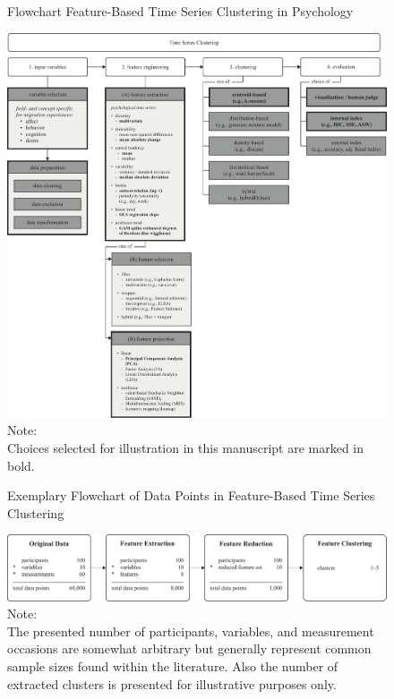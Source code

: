 \documentclass[man, 12pt, a4paper, mask]{apa7}
\theoremstyle{break}
\theoremstyle{plain}
\begin{document}
\begin{figure}[hbtp]
  \caption{Flowchart Feature-Based Time Series Clustering in Psychology}
  \label{fig:TSCFlow}
  \centering\includegraphics[width=\textwidth]{figures/TS Cluster Flow/TimeSeriesClusterFlowSelection.pdf}
  \caption*{Note: \\
  Choices selected for illustration in this manuscript are marked in bold.}
\end{figure}

\begin{figure}[hbtp]
  \caption{Exemplary Flowchart of Data Points in Feature-Based Time Series Clustering}
  \label{fig:TSCFlowN}
  \centering\includegraphics[width=\textwidth]{figures/TS Cluster Flow/tsClustFlowN.pdf}
  \caption*{Note: \\
  The presented number of participants, variables, and measurement occasions are somewhat arbitrary but generally represent common sample sizes found within the literature. Also the number of extracted clusters is presented for illustrative purposes only.}
\end{figure}
\end{document}
